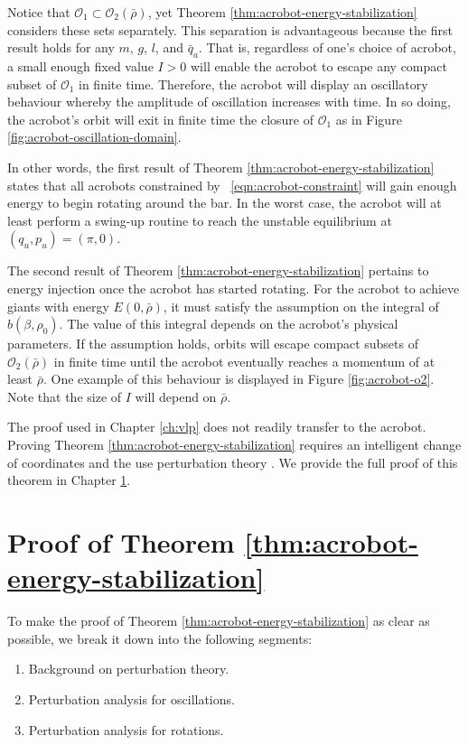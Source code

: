 Notice that \(\mathcal{O}_1 \subset \mathcal{O}_2(\bar{\rho})\), yet
Theorem \ref{thm:acrobot-energy-stabilization} considers these sets separately.
This separation is advantageous because the first result holds for any
\(m\), \(g\), \(l\), and \(\bar{q}_a\). 
That is, regardless of one's choice of acrobot, 
a small enough fixed value \(I > 0\) will enable the acrobot to 
escape any compact subset of \(\mathcal{O}_1\) in finite time.
Therefore, the acrobot will display an oscillatory behaviour whereby the
amplitude of oscillation increases with time.
In so doing, the acrobot's orbit will exit in finite time the closure of
\(\mathcal{O}_1\) as in Figure \ref{fig:acrobot-oscillation-domain}.

In other words, the first result of Theorem
\ref{thm:acrobot-energy-stabilization} states that all acrobots constrained by
~\eqref{eqn:acrobot-constraint} will gain enough energy to begin rotating around
the bar.
In the worst case, the acrobot will at least perform a swing-up routine to reach
the unstable equilibrium at \((q_u,p_u) = (\pi,0)\).

The second result of Theorem
\ref{thm:acrobot-energy-stabilization} pertains to energy injection once the
acrobot has started rotating.
For the acrobot to achieve giants with energy
\(E(0,\bar{\rho})\), it must satisfy the assumption on the integral of
\(b(\beta,\rho_0)\).
The value of this integral depends on the acrobot's physical parameters.
If the assumption holds, orbits will escape compact subsets of
\(\mathcal{O}_2(\bar{\rho})\) in finite time until the acrobot eventually
reaches a momentum of at least \(\bar{\rho}\).
One example of this behaviour is displayed in Figure \ref{fig:acrobot-o2}.
Note that the size of \(I\) will depend on \(\bar{\rho}\).

The proof used in Chapter \ref{ch:vlp} does not
readily transfer to the acrobot.
Proving Theorem \ref{thm:acrobot-energy-stabilization} requires an intelligent
change of coordinates and the use perturbation
theory \cite{khalil_nonlinear}.
We provide the full proof of this theorem in Chapter \ref{sec:acrobot-proof}.
 
\section{Proof of Theorem \ref{thm:acrobot-energy-stabilization}}\label{sec:acrobot-proof}
To make the proof of Theorem \ref{thm:acrobot-energy-stabilization}
as clear as possible, we break it down into the following segments:
\begin{enumerate}
    \item Background on perturbation theory.
    \item Perturbation analysis for oscillations.
    \item Perturbation analysis for rotations.
\end{enumerate}

